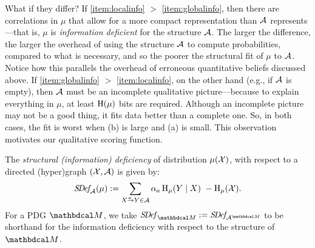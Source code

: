 What if they differ?
If \ref{item:localinfo} $>$ \ref{item:globalinfo}, then there are
correlations in $\mu$ that allow for a more compact representation
than $\mathcal A$ represents---that is, $\mu$ is \emph{information deficient} for the structure $\mathcal A$. 
The larger the difference, 
the larger the overhead of using the structure $\mathcal A$ to compute probabilities, compared to what is necessary,
    and so the poorer the structural fit of $\mu$ to $\mathcal A$.
Notice how this parallels the overhead of erroneous quantitative beliefs discussed above.
If \ref{item:globalinfo} $>$ \ref{item:localinfo}, 
on the other hand (e.g., if $\mathcal A$ is empty), then $\mathcal A$ must be an incomplete qualitative picture---because to explain everything in $\mu$, at least $\operatorname{\mathrm{H}}(\mu)$ bits are required.
Although an incomplete picture may not be a good thing, 
	it fits data better than a complete one. 
So, in both cases, the fit is worst when (b) is large and (a) is small.
This observation motivates our qualitative scoring function.
%
% 

\begin{defn}\label{def:info-deficiency}
The \emph{structural (information) deficiency}
of distribution $\mu(\mathcal X)$, with respect to a directed (hyper)graph $(\mathcal X,\mathcal A)$ is given by:
\begin{equation}
	\SDef_{\!\Ar}(\mu) := \sum_{\ed aXY \in \Ar}
        \alpha_a
        \H_\mu(Y\mid X) ~- \H_\mu(\X). 
	\label{eqn:alt-extra}
\end{equation}
For a PDG ${\dg M}$, we take $\SDef_{\dg M} := \SDef_{\!\Ar^{\dg M}}$
to be shorthand for the information deficiency with respect to the  structure of $\dg M$.
\end{defn}


